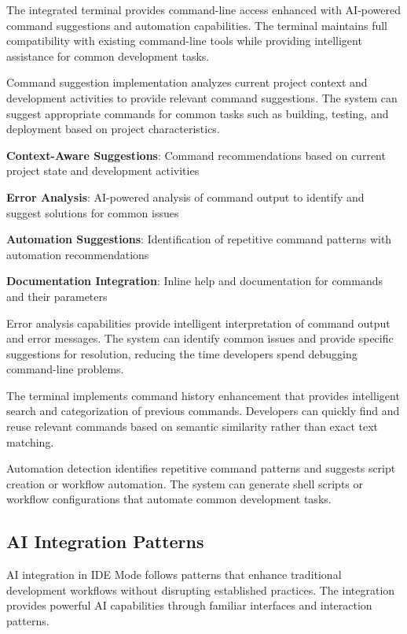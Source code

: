 The integrated terminal provides command-line access enhanced with AI-powered command suggestions and automation capabilities. The terminal maintains full compatibility with existing command-line tools while providing intelligent assistance for common development tasks.

Command suggestion implementation analyzes current project context and development activities to provide relevant command suggestions. The system can suggest appropriate commands for common tasks such as building, testing, and deployment based on project characteristics.

\begin{expandedlist}
    \item \textbf{Context-Aware Suggestions}: Command recommendations based on current project state and development activities
    \item \textbf{Error Analysis}: AI-powered analysis of command output to identify and suggest solutions for common issues
    \item \textbf{Automation Suggestions}: Identification of repetitive command patterns with automation recommendations
    \item \textbf{Documentation Integration}: Inline help and documentation for commands and their parameters
\end{expandedlist}

Error analysis capabilities provide intelligent interpretation of command output and error messages. The system can identify common issues and provide specific suggestions for resolution, reducing the time developers spend debugging command-line problems.

The terminal implements command history enhancement that provides intelligent search and categorization of previous commands. Developers can quickly find and reuse relevant commands based on semantic similarity rather than exact text matching.

Automation detection identifies repetitive command patterns and suggests script creation or workflow automation. The system can generate shell scripts or workflow configurations that automate common development tasks.

\subsection*{AI Integration Patterns}

AI integration in IDE Mode follows patterns that enhance traditional development workflows without disrupting established practices. The integration provides powerful AI capabilities through familiar interfaces and interaction patterns.

